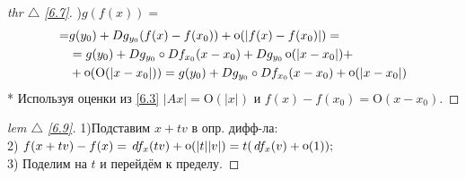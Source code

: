 \begin{minipage}[]{0.45\textwidth}
\begin{proof}[
 thr $\triangle$
\eqref{6.7}]

\phantom{42}
)$g(f(x)) =$
\begin{equation*}
	\begin{aligned}
		= &g(y_0) + D g_{y_0}(f(x) - f(x_0)) + \mathop{\mathrm{o}}\nolimits (|f(x) - f(x_0)|) = \\
		&= g(y_0) + D g_{y_0} \circ D f_{x_0} (x-x_0) + D g_{y_0} \mathop{\mathrm{o}}\nolimits (|x-x_0|) +\\
		&+ \mathop{\mathrm{o}}\nolimits (\text{O}(|x-x_0|)) = g(y_0) + D g_{y_0} \circ D f_{x_0}(x-x_0) + \mathop{\mathrm{o}}\nolimits (|x - x_0|)
	\end{aligned}
\end{equation*}
* Используя оценки из \eqref{6.3} $|A x| = \text{O}(|x|)$ и $f(x) - f(x_0) = \text{O}(x-x_0)$.
\end{proof}


\begin{proof}[
lem $\triangle$
\eqref{6.9}]

\phantom{42}
\noindent

1)Подставим $x + t v$ в опр. дифф-ла:\\
2) $f(x + t v) - f (x) = \, d f_x (t v) + \mathop{\mathrm{o}}\nolimits (|t| |v|) = t (\, d f_x(v) + \mathop{\mathrm{o}}\nolimits(1));$\\
3) Поделим на $t$ и перейдём к пределу.

\end{proof}
\end{minipage}

